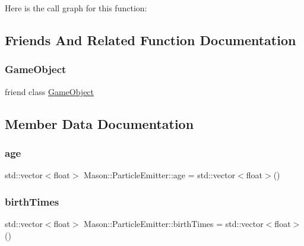 Here is the call graph for this function\+:


\subsection{Friends And Related Function Documentation}
\hypertarget{class_mason_1_1_particle_emitter_a00df87c957d8f7ee0fc51f07a0542f4a}{}\label{class_mason_1_1_particle_emitter_a00df87c957d8f7ee0fc51f07a0542f4a} 
\subsubsection{\texorpdfstring{Game\+Object}{GameObject}}
{\footnotesize\ttfamily friend class \hyperlink{class_mason_1_1_game_object}{Game\+Object}\hspace{0.3cm}{\ttfamily [friend]}}



\subsection{Member Data Documentation}
\hypertarget{class_mason_1_1_particle_emitter_af8aa10f22ae7a4662b198d52c2424d3c}{}\label{class_mason_1_1_particle_emitter_af8aa10f22ae7a4662b198d52c2424d3c} 
\subsubsection{\texorpdfstring{age}{age}}
{\footnotesize\ttfamily std\+::vector$<$float$>$ Mason\+::\+Particle\+Emitter\+::age = std\+::vector$<$float$>$()\hspace{0.3cm}{\ttfamily [protected]}}

\hypertarget{class_mason_1_1_particle_emitter_aa7e4b79447b8c65255b92d313464a03c}{}\label{class_mason_1_1_particle_emitter_aa7e4b79447b8c65255b92d313464a03c} 
\subsubsection{\texorpdfstring{birth\+Times}{birthTimes}}
{\footnotesize\ttfamily std\+::vector$<$float$>$ Mason\+::\+Particle\+Emitter\+::birth\+Times = std\+::vector$<$float$>$()\hspace{0.3cm}{\ttfamily [protected]}}

